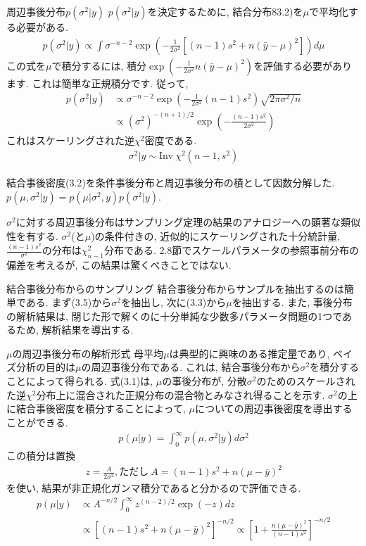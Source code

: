 \documentclass[10pt,dvipdfmx,a4]{beamer}
\newcommand{\eq}[1]{\begin{align}#1\end{align}}
\newcommand{\eqn}[1]{\begin{align*}#1\end{align*}}
\begin{document}

\begin{frame}{周辺事後分布$p(\sigma^2|y)$}
$p(\sigma^2|y)$を決定するために, 結合分布83.2)を$\mu$で平均化する必要がある.
\eqn{p(\sigma^2|y)\propto \int\sigma^{-n-2}\exp \left(-\frac{1}{2\sigma^2}[(n-1)s^2+n(\bar{y}-\mu)^2]\right)d\mu}
この式を$\mu$で積分するには, 積分$\exp(-\tfrac{1}{2\sigma^2}n(\bar{y}-\mu)^2)$を評価する必要があります.
これは簡単な正規積分です.
従って, 
\eq{p(\sigma^2|y)&\propto \sigma^{-n-2}\exp \left(-\frac{1}{2\sigma^2}(n-1)s^2\right)\sqrt{2\pi\sigma^2/n}\nonumber\\
&\propto(\sigma^2)^{-(n+1)/2}\exp\left(-\frac{(n-1)s^2}{2\sigma^2}\right)}
これはスケーリングされた逆$\chi^2$密度である.
\eq{\sigma^2|y\sim \text{Inv}\ \chi^2(n-1,s^2)}
\end{frame}


\begin{frame}
結合事後密度(3.2)を条件事後分布と周辺事後分布の積として因数分解した.
$p(\mu,\sigma^2|y)=p(\mu|\sigma^2, y)p(\sigma^2|y)$.

$\sigma^2$に対する周辺事後分布はサンプリング定理の結果のアナロジーへの顕著な類似性を有する.
$\sigma^2$(と$\mu$)の条件付きの, 近似的にスケーリングされた十分統計量, $\tfrac{(n-1)s^2}{\sigma^2}$の分布は$\chi^2_{n-1}$分布である.
2.8節でスケールパラメータの参照事前分布の偏差を考えるが, この結果は驚くべきことではない.
\end{frame}


\begin{frame}{結合事後分布からのサンプリング}
結合事後分布からサンプルを抽出するのは簡単である.
まず(3.5)から$\sigma^2$を抽出し, 次に(3.3)から$\mu$を抽出する.
また, 事後分布の解析結果は, 閉じた形で解くのに十分単純な少数多パラメータ問題の1つであるため, 解析結果を導出する.
\end{frame}


\begin{frame}{$\mu$の周辺事後分布の解析形式}
母平均$\mu$は典型的に興味のある推定量であり, ベイズ分析の目的は$\mu$の周辺事後分布である.
これは, 結合事後分布から$\sigma^2$を積分することによって得られる.
式(3.1)は, $\mu$の事後分布が, 分散$\sigma^2$のためのスケールされた逆$\chi^2$分布上に混合された正規分布の混合物とみなされ得ることを示す.
$\sigma^2$の上に結合事後密度を積分することによって, $\mu$についての周辺事後密度を導出することができる.
\eqn{p(\mu|y)=\int_0^{\infty}p(\mu,\sigma^2|y)d\sigma^2}
この積分は置換
\eqn{z=\frac{A}{2\sigma^2}, \text{ただし}\ A=(n-1)s^2+n(\mu-\bar{y})^2}
を使い, 結果が非正規化ガンマ積分であると分かるので評価できる.
\eqn{p(\mu|y)&\propto A^{-n/2}\int_0^{\infty}z^{(n-2)/2}\exp(-z)dz\\
&\propto [(n-1)s^2+n(\mu-\bar{y})^2]^{-n/2}
\propto \left[ 1+\frac{n(\mu-\bar{y})^2}{(n-1)s^2}\right]^{-n/2}}
\end{frame}
\end{document}
